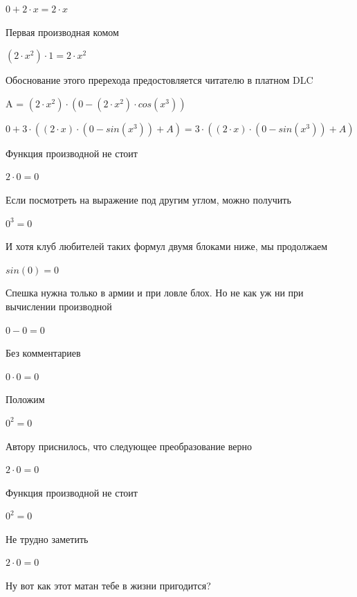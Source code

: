 \documentclass[12pt,a4paper,fleqn]{article}
\begin{document}
\begin{center}
$0+2 \cdot x = 2 \cdot x$\end{center}
Первая производная комом\cite{link2}

\begin{center}
$(2 \cdot x^{2}) \cdot 1 = 2 \cdot x^{2}$\end{center}
Обоснование этого пререхода предостовляется читателю в платном DLC

\begin{center}
A = $(2 \cdot x^{2}) \cdot (0-(2 \cdot x^{2}) \cdot cos(x^{3}))$\end{center}
\begin{center}
$0+3 \cdot ((2 \cdot x) \cdot (0-sin(x^{3}))+A) = 3 \cdot ((2 \cdot x) \cdot (0-sin(x^{3}))+A)$\end{center}
Функция производной не стоит\cite{link2}

\begin{center}$2 \cdot 0 = 0$\end{center}
Если посмотреть на выражение под другим углом, можно получить

\begin{center}$0^{3} = 0$\end{center}
И хотя клуб любителей таких формул двумя блоками ниже, мы продолжаем

\begin{center}$sin(0) = 0$\end{center}
Спешка нужна только в армии и при ловле блох. Но не как уж ни при вычислении производной\cite{link2}

\begin{center}$0-0 = 0$\end{center}
Без комментариев\cite{link4}

\begin{center}$0 \cdot 0 = 0$\end{center}
Положим

\begin{center}$0^{2} = 0$\end{center}
Автору приснилось, что следующее преобразование верно

\begin{center}$2 \cdot 0 = 0$\end{center}
Функция производной не стоит\cite{link2}

\begin{center}$0^{2} = 0$\end{center}
Не трудно заметить

\begin{center}$2 \cdot 0 = 0$\end{center}
Ну вот как этот матан тебе в жизни пригодится?
\end{document}
